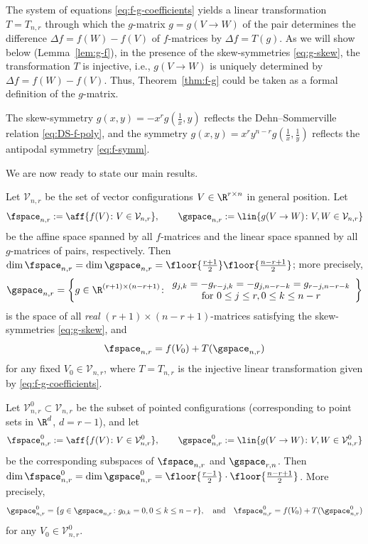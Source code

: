 \begin{remark} 
\label{rem:g-f+DS-g}
The system of equations \eqref{eq:f-g-coefficients} yields a linear transformation $T=T_{n,r}$ through which 
the $g$-matrix $g=g(V\to W)$ of the pair determines the difference $\Delta f=f(W)-f(V)$ of $f$-matrices by $\Delta f=T(g)$. As we will show below (Lemma~\ref{lem:g-f}), in the presence of the skew-symmetries \eqref{eq:g-skew}, the transformation $T$ is injective, i.e., $g(V\to W)$ is uniquely determined by $\Delta f=f(W)-f(V)$. Thus, Theorem~\ref{thm:f-g} could be taken as a formal definition of the $g$-matrix. 
\end{remark}
\begin{remark}
The skew-symmetry $g(x,y)=-x^r g(\frac{1}{x},y)$ reflects the Dehn--Sommerville relation \eqref{eq:DS-f-poly}, and 
the symmetry $g(x,y)=x^ry^{n-r}g(\frac{1}{x},\frac{1}{y})$ reflects the antipodal symmetry \eqref{eq:f-symm}.
\end{remark}
%
We are now ready to state our main results.
%
\begin{theorem}
\label{thm:f-space-g-space} 
Let $\mathcal{V}_{n,r}$ be the set of vector configurations $V\in \R^{r\times n}$ in general position. Let 
\[
\fspace_{n,r}:=\aff\{f(V)\colon V\in \mathcal{V}_{n,r}\}, \qquad \gspace_{n,r}:=\lin\{g(V \to W) \colon V,W \in \mathcal{V}_{n,r}\} 
\]
be the affine space spanned by all $f$-matrices and the linear space spanned by all $g$-matrices of pairs, respectively.
Then $\dim \fspace_{n,r}=\dim \gspace_{n,r}=\floor{\frac{r+1}{2}}\floor{\frac{n-r+1}{2}}$; more precisely, 
\begin{equation}
\label{eq:g-space}
\gspace_{n,r}=\left\{ g \in \R^{(r+1)\times (n-r+1)} \colon \begin{array}{c}g_{j,k}=-g_{r-j,k}=-g_{j,n-r-k}=g_{r-j,n-r-k}\\ \textrm{for } 0\leq j\leq r, 0\leq k\leq n-r\end{array}
\right\}
\end{equation}
is the space of all \emph{real} $(r+1)\times (n-r+1)$-matrices satisfying the skew-symmetries \eqref{eq:g-skew}, and 
\[
\fspace_{n,r}=f(V_0)+T(\gspace_{n,r})
\]
for any fixed $V_0 \in \mathcal{V}_{n,r}$, where $T=T_{n,r}$ is the injective linear transformation given by \eqref{eq:f-g-coefficients}.
\end{theorem}
%
\begin{theorem}
\label{thm:f-space-g-space-pointed}
Let $\mathcal{V}^0_{n,r} \subset \mathcal{V}_{n,r}$ be the subset of pointed configurations (corresponding to point sets in $\R^d$, $d=r-1$), and let  
\[
\fspace^0_{n,r}:=\aff\{f(V)\colon V\in \mathcal{V}^0_{n,r}\}, \qquad \gspace^0_{n,r}:=\lin\{g(V \to W) \colon V,W \in \mathcal{V}^0_{n,r}\}
\]
be the corresponding subspaces of $\fspace_{n,r}$ and $\gspace_{r,n}$. Then $\dim \fspace^0_{n,r}=\dim \gspace^0_{n,r}=\floor{\frac{r-1}{2}}\cdot \floor{\frac{n-r+1}{2}}$. More precisely, 
\[
\gspace^0_{n,r}=\{g\in \gspace_{n,r}\colon g_{0,k}=0, 0\leq k \leq n-r\},\quad \textrm{and}\quad \fspace^0_{n,r}=f(V_0)+T(\gspace^0_{n,r})
\]
for any $V_0 \in \mathcal{V}^0_{n,r}$.
\end{theorem}
